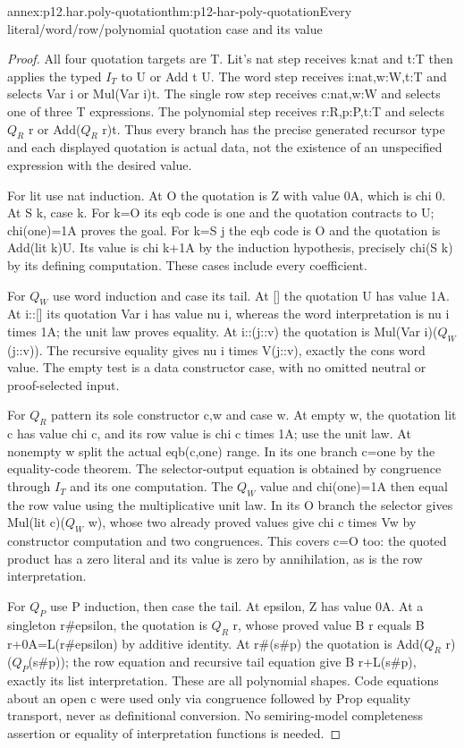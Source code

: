 \begin{annexitem}{annex:p12.har.poly-quotation}{thm:p12-har-poly-quotation}{Every literal/word/row/polynomial quotation case and its value}
\begin{proof}
All four quotation targets are T. Lit's nat step receives k:nat and
t:T then applies the typed \(I_T\) to U or Add t U. The word step
receives i:nat,w:W,t:T and selects Var i or Mul(Var i)t. The
single row step receives c:nat,w:W and selects one of three T
expressions. The polynomial step receives r:R,p:P,t:T and selects
\(Q_R\) r or Add(\(Q_R\) r)t. Thus every branch has the precise generated
recursor type and each displayed quotation is actual data, not the
existence of an unspecified expression with the desired value.

For lit use nat induction. At O the quotation is Z with value 0A,
which is chi 0. At S k, case k. For k=O its eqb code is one and
the quotation contracts to U; chi(one)=1A proves the goal. For
k=S j the eqb code is O and the quotation is Add(lit k)U. Its
value is chi k+1A by the induction hypothesis, precisely chi(S k)
by its defining computation. These cases include every coefficient.

For \(Q_W\) use word induction and case its tail. At [] the quotation
U has value 1A. At i::[] its quotation Var i has value nu i, whereas
the word interpretation is nu i times 1A; the unit law proves equality.
At i::(j::v) the quotation is Mul(Var i)(\(Q_W\)(j::v)). The recursive
equality gives nu i times V(j::v), exactly the cons word value.
The empty test is a data constructor case, with no omitted neutral
or proof-selected input.

For \(Q_R\) pattern its sole constructor c,w and case w. At empty w,
the quotation lit c has value chi c, and its row value is chi c
times 1A; use the unit law. At nonempty w split the actual eqb(c,one)
range. In its one branch c=one by the equality-code theorem. The
selector-output equation is obtained by congruence through \(I_T\) and
its one computation. The \(Q_W\) value and chi(one)=1A then equal the
row value using the multiplicative unit law. In its O branch the
selector gives Mul(lit c)(\(Q_W\) w), whose two already proved values
give chi c times Vw by constructor computation and two congruences.
This covers c=O too: the quoted product has a zero literal and its
value is zero by annihilation, as is the row interpretation.

For \(Q_P\) use P induction, then case the tail. At epsilon, Z has value
0A. At a singleton r\#epsilon, the quotation is \(Q_R\) r, whose proved
value B r equals B r+0A=L(r\#epsilon) by additive identity. At r\#(s\#p)
the quotation is Add(\(Q_R\) r)(\(Q_P\)(s\#p)); the row equation and recursive
tail equation give B r+L(s\#p), exactly its list interpretation.
These are all polynomial shapes. Code equations about an open c were
used only via congruence followed by Prop equality transport, never
as definitional conversion. No semiring-model completeness assertion
or equality of interpretation functions is needed.
\end{proof}
\end{annexitem}

